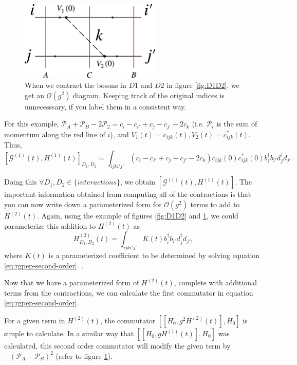 \begin{figure}
    \includegraphics[width = 0.6\textwidth]{figures/contraction.pdf}
    \caption{When we contract the bosons in $D1$ and $D2$ in figure \ref{fig:D1D2}, we get an $\mathcal{O}(g^2)$ diagram. Keeping track of the original indices is unnecesssary, if you label them in a consistent way.}
    \label{fig:contraction}
\end{figure}

For this example, $\mathcal{P}_A + \mathcal{P}_B - 2\mathcal{P}_2 = c_i - c_{i'} + c_j - c_{j'} - 2c_k$ (i.e. $\mathcal{P}_i$ is the sum of momentum along the red line of $i$), and $V_1(t) = c_{ijk}(t), V_2(t) = \bar c^*_{ijk}(t)$. Thus, $$\left[\mathcal{G}^{(1)}(t), H^{(1)}(t) \right]_{D_1, D_2} = \int_{ijki'j'}\left(c_i - c_{i'} + c_j - c_{j'} - 2c_k \right)c_{ijk}(0)\bar c^*_{ijk}(0) b_i^\dagger b_{i'}d_j^\dagger d_{j'}.$$

Doing this $\forall D_1, D_2 \in \{interactions\}$, we obtain $\left[\mathcal{G}^{(1)}(t), H^{(1)}(t) \right]$. 
The important information obtained from computing all of the contractions is that you can now write down a parameterized form for $\mathcal{O}(g^2)$ terms to add to $H^{(2)}(t)$. 
Again, using the example of figures \ref{fig:D1D2} and \ref{fig:contraction}, we could parameterize this addition to $H^{(2)}(t)$ as $$H^{(2)}_{D_1, D_2}(t) = \int_{ijki'j'}K(t)  b_i^\dagger b_{i'}d_j^\dagger d_{j'},$$ where $K(t)$ is a parameterized coefficient to be determined by solving equation \ref{eq:rgpep-second-order}. .

Now that we have a parameterized form of $H^{(2)}(t)$, complete with additional terms from the contractions, we can calculate the first commutator in equation \ref{eq:rgpep-second-order}.

For a given term in $H^{(2)}(t)$, the commutator $\left[\left[H_0, g^2H^{(2)}(t)\right], H_0\right]$ is simple to calculate. 
In a similar way that $\left[\left[H_0, gH^{(1)}(t)\right], H_0\right]$ was calculated, this second order commutator will modify the given term by $-\left(\mathcal{P}_A - \mathcal{P}_B\right)^2$ (refer to figure \ref{fig:contraction}).


